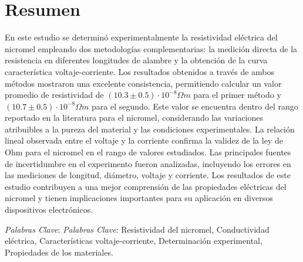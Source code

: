 \documentclass[article,12pt]{elsarticle}
\begin{document}
\section*{Resumen}
En este estudio se determinó experimentalmente la resistividad eléctrica del nicromel empleando dos metodologías complementarias: la medición directa de la resistencia en diferentes longitudes de alambre y la obtención de la curva característica voltaje-corriente. Los resultados obtenidos a través de ambos métodos mostraron una excelente consistencia, permitiendo calcular un valor promedio de resistividad de $(10.3 \pm 0.5) \cdot 10^{-8} \Omega m$ para el primer método y $(10.7 \pm 0.5) \cdot 10^{-8} \Omega m$ para el segundo. Este valor se encuentra dentro del rango reportado en la literatura para el nicromel, considerando las variaciones atribuibles a la pureza del material y las condiciones experimentales. La relación lineal observada entre el voltaje y la corriente confirma la validez de la ley de Ohm para el nicromel en el rango de valores estudiados. Las principales fuentes de incertidumbre en el experimento fueron analizadas, incluyendo los errores en las mediciones de longitud, diámetro, voltaje y corriente. Los resultados de este estudio contribuyen a una mejor comprensión de las propiedades eléctricas del nicromel y tienen implicaciones importantes para su aplicación en diversos dispositivos electrónicos.

\noindent \textit{Palabras Clave}: \textit{Palabras Clave}: Resistividad del nicromel, Conductividad eléctrica, Características voltaje-corriente, Determinación experimental, Propiedades de los materiales.\\ \hline
\end{document}
